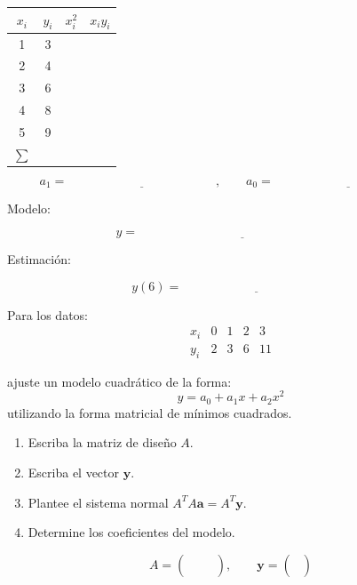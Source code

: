 \documentclass[10pt,respuestas,a4]{aleph-examen}
\begin{document}
\begin{preguntas}
\begin{center}
\renewcommand{\arraystretch}{1.4}
\begin{tabular}{c|c|c|c}
\toprule
$x_i$ & $y_i$ & $x_i^2$ & $x_iy_i$ \\
\midrule
1 & 3 &  &  \\
2 & 4 &  &  \\
3 & 6 &  &  \\
4 & 8 &  &  \\
5 & 9 &  &  \\
\midrule
$\sum$ &  &  &  \\
\bottomrule
\end{tabular}
\end{center}

\[
a_1=\underline{\hspace{5cm}}, 
\qquad
a_0=\underline{\hspace{5cm}}
\]

Modelo:

\[
y=\underline{\hspace{7cm}}
\]

Estimación:

\[
y(6)=\underline{\hspace{5cm}}
\]


\item
Para los datos: 
\[
\begin{array}{c|cccc}
x_i & 0 & 1 & 2 & 3 \\
\hline
y_i & 2 & 3 & 6 & 11
\end{array}
\]

ajuste un modelo cuadrático de la forma:
\[
y=a_0+a_1x+a_2x^2
\]
utilizando la forma matricial de mínimos cuadrados.

\begin{enumerate}[label=\alph*)]
    \item Escriba la matriz de diseño $A$.
    \item Escriba el vector $\mathbf{y}$.
    \item Plantee el sistema normal $A^TA\mathbf{a}=A^T\mathbf{y}$.
    \item Determine los coeficientes del modelo.
\end{enumerate}

\[
A=
\begin{pmatrix}
 &  &  \\
 &  &  \\
 &  &  \\
 &  & 
\end{pmatrix},
\qquad
\mathbf{y}=
\begin{pmatrix}
\\
\\
\\
\end{pmatrix}
\]


\end{preguntas}
\end{document}
